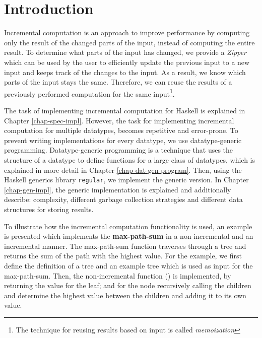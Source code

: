 \chapter{Introduction}


Incremental computation is an approach to improve performance by computing only the result of the changed parts of the input, instead of computing the entire result. To determine what parts of the input has changed, we provide a \textit{Zipper} which can be used by the user to efficiently update the previous input to a new input and keeps track of the changes to the input. As a result, we know which parts of the input stays the same. Therefore, we can reuse the results of a previously performed computation for the same input\footnote{The technique for reusing results based on input is called \textit{memoization}}.   

The task of implementing incremental computation for Haskell is explained in Chapter \ref*{chap-spec-impl}. However, the task for implementing incremental computation for multiple datatypes, becomes repetitive and error-prone. To prevent writing implementations for every datatype, we use datatype-generic programming. Datatype-generic programming is a technique that uses the structure of a datatype to define functions for a large class of datatypes, which is explained in more detail in Chapter \ref*{chap-dat-gen-program}. Then, using the Haskell generics library \texttt{regular}, we implement the generic version. In Chapter \ref*{chap-gen-impl}, the generic implementation is explained and additionally describe: complexity, different garbage collection strategies and different data structures for storing results. 

To illustrate how the incremental computation functionality is used, an example is presented which implements the \textbf{max-path-sum} in a non-incremental and an incremental manner. The max-path-sum function traverses through a tree and returns the sum of the path with the highest value. For the example, we first define the definition of a tree and an example tree which is used as input for the max-path-sum. Then, the non-incremental function () is implemented, by returning the value for the leaf; and for the node recursively calling the children and determine the highest value between the children and adding it to its own value.

